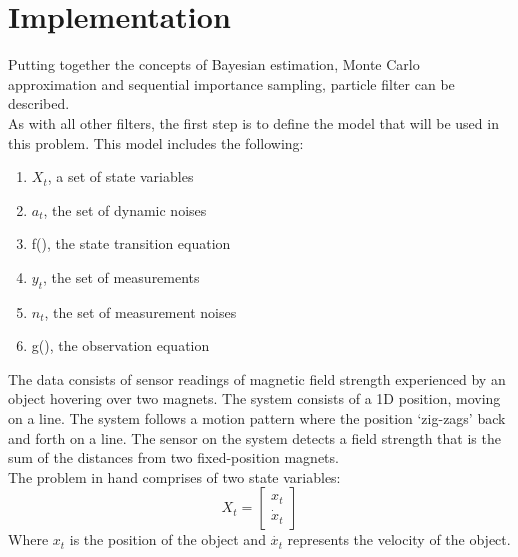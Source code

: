 \documentclass[12pt]{article}
\begin{document}
\section{Implementation}
Putting together the concepts of Bayesian estimation, Monte Carlo approximation and sequential importance sampling, particle filter can be described. \\
As with all other filters, the first step is to define the model that will be used in this problem. This model includes the following: 
\begin{enumerate}
\item $X_t$, a set of state variables
\item $a_t$, the set of dynamic noises
\item f(), the state transition equation
\item $y_t$, the set of measurements
\item $n_t$, the set of measurement noises
\item g(), the observation equation
\end{enumerate}

The data consists of sensor readings of magnetic field strength experienced by an object hovering over two magnets. The system consists of a 1D position, moving on a line. The system follows a motion pattern where the position `zig-zags' back and forth on a line. The sensor on the system detects a field strength that is the sum of the distances from two fixed-position magnets.\\

The problem in hand comprises of two state variables:
\begin{equation}
X_t = \begin{bmatrix}
x_t \\
\dot{x}_t
\end{bmatrix}
\label{eq:States}
\end{equation}
Where $x_t$ is the position of the object and $\dot{x_t}$ represents the velocity of the object.\\  
\end{document}
